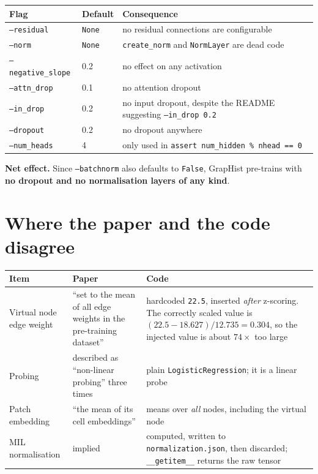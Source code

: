 \documentclass[10pt,a4paper]{article}
\begin{document}
\begin{longtable}{@{}p{3.4cm}p{2.4cm}p{9.8cm}@{}}
\toprule
\textbf{Flag} & \textbf{Default} & \textbf{Consequence} \\
\midrule \endhead
\texttt{--residual} & \texttt{None} & no residual connections are configurable \\
\texttt{--norm} & \texttt{None} & \texttt{create\_norm} and \texttt{NormLayer} are dead code \\
\texttt{--negative\_slope} & 0.2 & no effect on any activation \\
\texttt{--attn\_drop} & 0.1 & no attention dropout \\
\texttt{--in\_drop} & 0.2 & no input dropout, despite the README suggesting \texttt{--in\_drop 0.2} \\
\texttt{--dropout} & 0.2 & no dropout anywhere \\
\texttt{--num\_heads} & 4 & only used in \texttt{assert num\_hidden \% nhead == 0} \\
\bottomrule
\end{longtable}

\noindent\textbf{Net effect.} Since \texttt{--batchnorm} also defaults to
\texttt{False}, GrapHist pre-trains with \textbf{no dropout and no normalisation
layers of any kind}.

\section{Where the paper and the code disagree}
\label{sec:vn}

\begin{longtable}{@{}p{3.4cm}p{5.6cm}p{6.6cm}@{}}
\toprule
\textbf{Item} & \textbf{Paper} & \textbf{Code} \\
\midrule \endhead
Virtual node edge weight & ``set to the mean of all edge weights in the pre-training dataset'' & hardcoded \texttt{22.5}, inserted \emph{after} z-scoring. The correctly scaled value is $(22.5 - 18.627)/12.735 = 0.304$, so the injected value is about $74\times$ too large \\
Probing & described as ``non-linear probing'' three times & plain \texttt{LogisticRegression}; it is a linear probe \\
Patch embedding & ``the mean of its cell embeddings'' & means over \emph{all} nodes, including the virtual node \\
MIL normalisation & implied & computed, written to \texttt{normalization.json}, then discarded; \texttt{\_\_getitem\_\_} returns the raw tensor \\
\bottomrule
\end{longtable}
\end{document}
